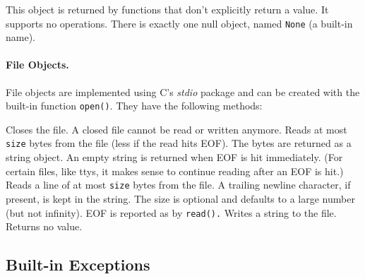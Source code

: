 This object is returned by functions that don't explicitly return a
value.
It supports no operations.
There is exactly one null object, named {\tt None}
(a built-in name).

\paragraph{File Objects.}

File objects are implemented using C's
{\em stdio}
package and can be created with the built-in function
{\tt open()}.
They have the following methods:
\begin{description}
Closes the file.
A closed file cannot be read or written anymore.
Reads at most
{\tt size}
bytes from the file (less if the read hits EOF).
The bytes are returned as a string object.
An empty string is returned when EOF is hit immediately.
(For certain files, like ttys, it makes sense to continue reading after
an EOF is hit.)
Reads a line of at most
{\tt size}
bytes from the file.
A trailing newline character, if present, is kept in the string.
The size is optional and defaults to a large number (but not infinity).
EOF is reported as by
{\tt read().}
Writes a string to the file.
Returns no value.
\end{description}

\subsection{Built-in Exceptions}

